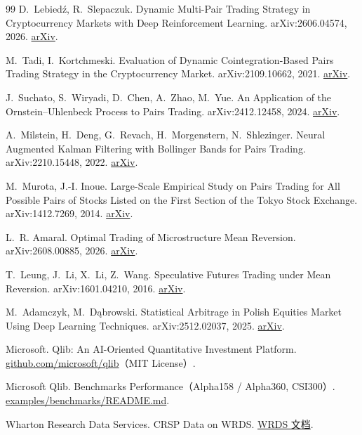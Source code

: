 \begin{thebibliography}{99}
 D.~Lebied\'z, R.~Slepaczuk. Dynamic Multi-Pair Trading Strategy in Cryptocurrency Markets with Deep Reinforcement Learning. arXiv:2606.04574, 2026. \href{https://arxiv.org/abs/2606.04574}{arXiv}.

 M.~Tadi, I.~Kortchmeski. Evaluation of Dynamic Cointegration-Based Pairs Trading Strategy in the Cryptocurrency Market. arXiv:2109.10662, 2021. \href{https://arxiv.org/abs/2109.10662}{arXiv}.

 J.~Suchato, S.~Wiryadi, D.~Chen, A.~Zhao, M.~Yue. An Application of the Ornstein--Uhlenbeck Process to Pairs Trading. arXiv:2412.12458, 2024. \href{https://arxiv.org/abs/2412.12458}{arXiv}.

 A.~Milstein, H.~Deng, G.~Revach, H.~Morgenstern, N.~Shlezinger. Neural Augmented Kalman Filtering with Bollinger Bands for Pairs Trading. arXiv:2210.15448, 2022. \href{https://arxiv.org/abs/2210.15448}{arXiv}.

 M.~Murota, J.-I. Inoue. Large-Scale Empirical Study on Pairs Trading for All Possible Pairs of Stocks Listed on the First Section of the Tokyo Stock Exchange. arXiv:1412.7269, 2014. \href{https://arxiv.org/abs/1412.7269}{arXiv}.

 L.~R. Amaral. Optimal Trading of Microstructure Mean Reversion. arXiv:2608.00885, 2026. \href{https://arxiv.org/abs/2608.00885}{arXiv}.

 T.~Leung, J.~Li, X.~Li, Z.~Wang. Speculative Futures Trading under Mean Reversion. arXiv:1601.04210, 2016. \href{https://arxiv.org/abs/1601.04210}{arXiv}.

 M.~Adamczyk, M.~D\k{a}browski. Statistical Arbitrage in Polish Equities Market Using Deep Learning Techniques. arXiv:2512.02037, 2025. \href{https://arxiv.org/abs/2512.02037}{arXiv}.

 Microsoft. Qlib: An AI-Oriented Quantitative Investment Platform. \href{https://github.com/microsoft/qlib}{github.com/microsoft/qlib}（MIT License）.

 Microsoft Qlib. Benchmarks Performance（Alpha158 / Alpha360, CSI300）. \href{https://github.com/microsoft/qlib/blob/main/examples/benchmarks/README.md}{examples/benchmarks/README.md}.

 Wharton Research Data Services. CRSP Data on WRDS. \href{https://wrds-www.wharton.upenn.edu/documents/1145/CRSP-Data-on-WRDS.pdf}{WRDS 文档}.


\end{thebibliography}
